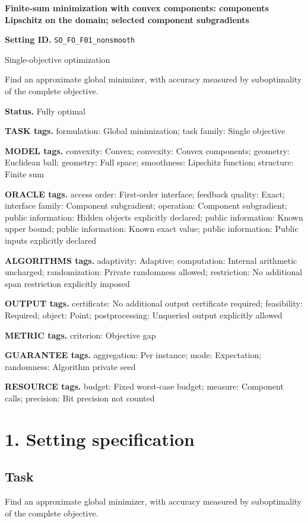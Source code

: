 \documentclass[10pt,a4paper]{article}
\begin{document}
\raggedright

{\LARGE\bfseries\sffamily\color{AtlasNavy} Finite-sum minimization with convex components: components Lipschitz on the domain; selected component subgradients\par}\vspace{5pt}
\textbf{Setting ID.} \texttt{SO\_\allowbreak{}FO\_\allowbreak{}F01\_\allowbreak{}nonsmooth}

Single-objective optimization

Find an approximate global minimizer, with accuracy measured by suboptimality of the complete objective.

\textbf{Status.} Fully optimal

\textbf{TASK tags.} formulation: Global minimization; task family: Single objective

\textbf{MODEL tags.} convexity: Convex; convexity: Convex components; geometry: Euclidean ball; geometry: Full space; smoothness: Lipschitz function; structure: Finite sum

\textbf{ORACLE tags.} access order: First-order interface; feedback quality: Exact; interface family: Component subgradient; operation: Component subgradient; public information: Hidden objects explicitly declared; public information: Known upper bound; public information: Known exact value; public information: Public inputs explicitly declared

\textbf{ALGORITHMS tags.} adaptivity: Adaptive; computation: Internal arithmetic uncharged; randomization: Private randomness allowed; restriction: No additional span restriction explicitly imposed

\textbf{OUTPUT tags.} certificate: No additional output certificate required; feasibility: Required; object: Point; postprocessing: Unqueried output explicitly allowed

\textbf{METRIC tags.} criterion: Objective gap

\textbf{GUARANTEE tags.} aggregation: Per instance; mode: Expectation; randomness: Algorithm private seed

\textbf{RESOURCE tags.} budget: Fixed worst-case budget; measure: Component calls; precision: Bit precision not counted

\section{1. Setting specification}
\subsection{Task}
Find an approximate global minimizer, with accuracy measured by suboptimality of the complete objective.
\end{document}
